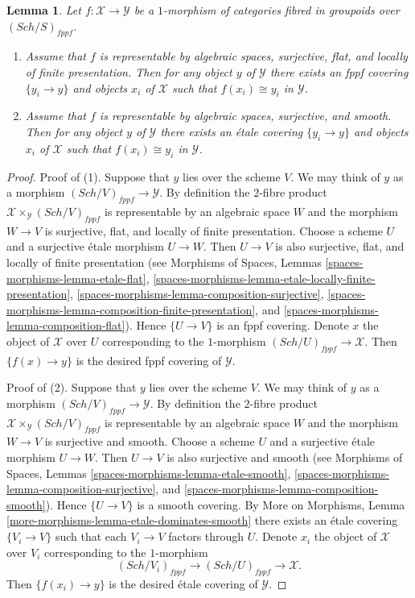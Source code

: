 \documentclass[10pt,a4paper]{amsart}
\theoremstyle{plain}
\newtheorem{lemma}[subsection]{Lemma}
\theoremstyle{definition}
\theoremstyle{remark}
\numberwithin{equation}{subsection}
\def\Sch{\mathit{Sch}}
\begin{document}
\begin{lemma}
\label{lemma-surjective-flat-locally-finite-presentation}
Let $f : \mathcal{X} \to \mathcal{Y}$ be a $1$-morphism of
categories fibred in groupoids over $(\Sch/S)_{fppf}$.
\begin{enumerate}
\item Assume that $f$ is representable by algebraic spaces, surjective,
flat, and locally of finite presentation. Then for any object $y$ of
$\mathcal{Y}$ there exists an fppf covering $\{y_i \to y\}$ and objects
$x_i$ of $\mathcal{X}$ such that $f(x_i) \cong y_i$ in $\mathcal{Y}$.
\item Assume that $f$ is representable by algebraic spaces, surjective,
and smooth. Then for any object $y$ of
$\mathcal{Y}$ there exists an \'etale covering $\{y_i \to y\}$ and objects
$x_i$ of $\mathcal{X}$ such that $f(x_i) \cong y_i$ in $\mathcal{Y}$.
\end{enumerate}
\end{lemma}

\begin{proof}
Proof of (1). Suppose that $y$ lies over the scheme $V$.
We may think of $y$ as a morphism $(\Sch/V)_{fppf} \to \mathcal{Y}$.
By definition the $2$-fibre product
$\mathcal{X} \times_\mathcal{Y} (\Sch/V)_{fppf}$
is representable by an algebraic space $W$ and the morphism
$W \to V$ is surjective, flat, and locally of finite presentation.
Choose a scheme $U$ and a surjective \'etale morphism $U \to W$.
Then $U \to V$ is also surjective, flat, and locally of finite presentation
(see Morphisms of Spaces, Lemmas
\ref{spaces-morphisms-lemma-etale-flat},
\ref{spaces-morphisms-lemma-etale-locally-finite-presentation},
\ref{spaces-morphisms-lemma-composition-surjective},
\ref{spaces-morphisms-lemma-composition-finite-presentation}, and
\ref{spaces-morphisms-lemma-composition-flat}).
Hence $\{U \to V\}$ is an fppf covering. Denote $x$ the object of
$\mathcal{X}$ over $U$ corresponding to the $1$-morphism
$(\Sch/U)_{fppf} \to \mathcal{X}$. Then $\{f(x) \to y\}$ is
the desired fppf covering of $\mathcal{Y}$.

\medskip\noindent
Proof of (2). Suppose that $y$ lies over the scheme $V$.
We may think of $y$ as a morphism $(\Sch/V)_{fppf} \to \mathcal{Y}$.
By definition the $2$-fibre product
$\mathcal{X} \times_\mathcal{Y} (\Sch/V)_{fppf}$
is representable by an algebraic space $W$ and the morphism
$W \to V$ is surjective and smooth.
Choose a scheme $U$ and a surjective \'etale morphism $U \to W$.
Then $U \to V$ is also surjective and smooth
(see Morphisms of Spaces, Lemmas
\ref{spaces-morphisms-lemma-etale-smooth},
\ref{spaces-morphisms-lemma-composition-surjective}, and
\ref{spaces-morphisms-lemma-composition-smooth}).
Hence $\{U \to V\}$ is a smooth covering. By
More on Morphisms, Lemma \ref{more-morphisms-lemma-etale-dominates-smooth}
there exists an \'etale covering $\{V_i \to V\}$ such that
each $V_i \to V$ factors through $U$. Denote $x_i$ the object of
$\mathcal{X}$ over $V_i$ corresponding to the $1$-morphism
$$
(\Sch/V_i)_{fppf} \to (\Sch/U)_{fppf} \to \mathcal{X}.
$$
Then $\{f(x_i) \to y\}$ is
the desired \'etale covering of $\mathcal{Y}$.
\end{proof}
\end{document}
